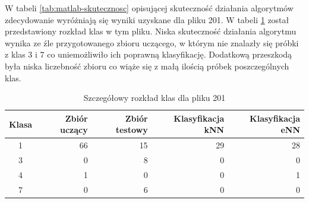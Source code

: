 W tabeli \ref{tab:matlab-skutecznosc} opisującej skuteczność działania algorytmów zdecydowanie wyróżniają się wyniki uzyskane dla pliku 201. W tabeli \ref{tab:matlab-plik201} został przedstawiony rozkład klas w tym pliku. Niska skuteczność działania algorytmu wynika ze źle przygotowanego zbioru uczącego, w którym nie znalazły się próbki z klas 3 i 7 co uniemożliwiło ich poprawną klasyfikację. Dodatkową przeszkodą była niska liczebność zbioru co wiąże się z małą ilością próbek poszczególnych klas.

\begin{table}[H]
	\centering
	\begin{tabular}{|c|r|r|r|r|}
		\hline
		
		Klasa & Zbiór uczący & Zbiór testowy & Klasyfikacja kNN & Klasyfikacja eNN \\
		\hline
		1 & 66 & 15 & 29 & 28 \\
		\hline 
		3 & 0 & 8 & 0 & 0 \\
		\hline
		4 & 1 & 0 & 0 & 1 \\
		\hline
		7 & 0 & 6 & 0 & 0 \\
		\hline
		
	\end{tabular}
	\caption{Szczegółowy rozkład klas dla pliku 201}
	\label{tab:matlab-plik201}
\end{table}



